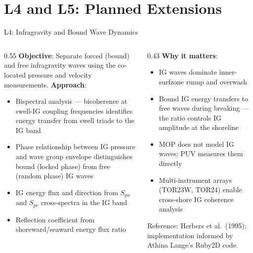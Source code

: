\documentclass[10pt, aspectratio=169]{beamer}
\begin{document}
\section{L4 and L5: Planned Extensions}

\begin{frame}{L4: Infragravity and Bound Wave Dynamics}
  \begin{columns}[T]
    \begin{column}{0.55\textwidth}
      \textbf{Objective}: Separate forced (bound) and free
      infragravity waves using the co-located pressure and
      velocity measurements.
      \vspace{0.5em}
      \textbf{Approach}:
      \begin{itemize}
        \item Bispectral analysis --- bicoherence at swell-IG
              coupling frequencies identifies energy transfer
              from swell triads to the IG band
        \item Phase relationship between IG pressure and wave
              group envelope distinguishes bound (locked phase)
              from free (random phase) IG waves
        \item IG energy flux and direction from $S_{pu}$ and
              $S_{pv}$ cross-spectra in the IG band
        \item Reflection coefficient from shoreward/seaward
              energy flux ratio
      \end{itemize}
    \end{column}
    \begin{column}{0.43\textwidth}
      \textbf{Why it matters}:
      \begin{itemize}
        \item IG waves dominate inner-surfzone runup
              and overwash
        \item Bound IG energy transfers to free waves during
              breaking --- the ratio controls IG amplitude
              at the shoreline
        \item MOP does not model IG waves; PUV measures them
              directly
        \item Multi-instrument arrays (TOR23W, TOR24) enable
              cross-shore IG coherence analysis
      \end{itemize}
      \vspace{0.5em}
      {\footnotesize Reference: Herbers et al.\ (1995);
      implementation informed by Athina Lange's Ruby2D code.}
    \end{column}
  \end{columns}
\end{frame}
\end{document}
